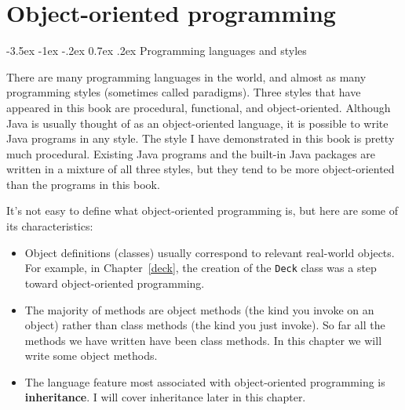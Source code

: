 \documentclass{book}
\makeatletter
\newcounter{exercisenum}
\renewcommand{\section}{\@startsection 
    {section} {1} {0mm}%
    {-3.5ex \@plus -1ex \@minus -.2ex}%
    {0.7ex \@plus.2ex}%
    {\normalfont\Large\bfseries}}
\newcommand{\clearemptydoublepage}{\newpage{\pagestyle{empty}\cleardoublepage}}
\newcommand{\beforechapter}{
    \cleardoublepage 
    \setcounter{exercisenum}{0}
}
\makeatother
\begin{document}
\beforechapter
\label{chap13}
\chapter{Object-oriented programming}

\section{Programming languages and styles}

There are many programming languages in the world, and almost as many
programming styles (sometimes called paradigms).  Three styles that
have appeared in this book are procedural, functional, and
object-oriented.  Although Java is usually thought of as an
object-oriented language, it is possible to write Java programs in any
style.  The style I have demonstrated in this book is pretty much
procedural.  Existing Java programs and the built-in Java packages are
written in a mixture of all three styles, but they tend to be more
object-oriented than the programs in this book.

It's not easy to define what object-oriented programming is,
but here are some of its characteristics:

\begin{itemize}

\item Object definitions (classes) usually correspond to 
relevant real-world objects.  For example, in Chapter~\ref{deck},
the creation of the {\tt Deck} class was a step toward object-oriented
programming.

\item The majority of methods are object methods (the kind you
invoke on an object) rather than class methods (the kind you just
invoke).  So far all the methods we have written have been class
methods.  In this chapter we will write some object methods.

\item The language feature most associated with object-oriented
programming is {\bf inheritance}.  I will cover inheritance later in
this chapter.

\end{itemize}
\end{document}
